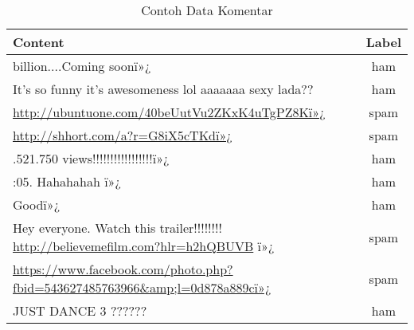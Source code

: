 \documentclass[a4paper,12pt]{report}
\numberwithin{equation}{chapter}
\begin{document}
\begin{table}[h!]
\centering
\caption{Contoh Data Komentar}
\label{tab:content_class}
\begin{tabularx}{\textwidth}{|>{\raggedright\arraybackslash}X|c|}
\hline
\textbf{Content} & \textbf{Label} \\
 billion....Coming soonï»¿ & ham \\
\hline
It's so funny it's awesomeness lol aaaaaaa sexy lada?? & ham \\
\hline
\url{http://ubuntuone.com/40beUutVu2ZKxK4uTgPZ8Kï»¿} & spam \\
\hline
\url{http://shhort.com/a?r=G8iX5cTKdï»¿} & spam \\
.521.750  views!!!!!!!!!!!!!!!!!ï»¿  & ham \\
:05. Hahahahah ï»¿ & ham \\
\hline
Goodï»¿  & ham \\
\hline
Hey everyone. Watch this trailer!!!!!!!! \url{http://believemefilm.com?hlr=h2hQBUVB} ï»¿ & spam \\
\hline 
\url{https://www.facebook.com/photo.php?fbid=543627485763966&amp;l=0d878a889cï»¿} & spam \\
\hline
JUST DANCE 3 ?????? & ham \\
\hline
\end{tabularx}
\end{table}
\end{document}
